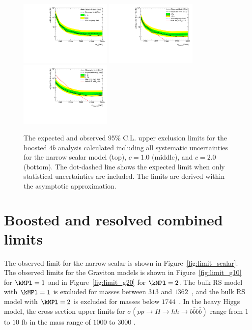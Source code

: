 \begin{figure}
\begin{center}
\includegraphics[width=0.4\textwidth,angle=-90]{figures/boosted/results/limit_boosted_boosted_okt18_s.pdf}
\includegraphics[width=0.4\textwidth,angle=-90]{figures/boosted/results/limit_boosted_boosted_okt18_g10.pdf}
\includegraphics[width=0.4\textwidth,angle=-90]{figures/boosted/results/limit_boosted_boosted_okt18_g20.pdf}
\caption{The expected and observed 95\% C.L. upper exclusion limits for the boosted $4b$ analysis calculated including all systematic uncertainties for the narrow scalar model (top), \Grav $c=1.0$ (middle), and \Grav $c=2.0$ (bottom). The dot-dashed line shows the expected limit when only statistical uncertainties are included. The limits are derived within the asymptotic approximation.}
\label{fig:limit_boosted}
\end{center}
\end{figure}


\section{Boosted and resolved combined limits}
\paragraph{}
The observed limit for the narrow scalar is shown in Figure~\ref{fig:limit_scalar}.
The observed limits for the Graviton models is shown in Figure~\ref{fig:limit_g10} for $\kMPl = 1$ and in Figure~\ref{fig:limit_g20} for $\kMPl = 2$.
The bulk RS model with $\kMPl = 1$ is excluded for masses between $313$ and $1362$~\GeV, and the bulk RS model with $\kMPl = 2$ is excluded for masses below $1744$~\GeV. 
In the heavy Higgs model, the cross section upper limits for $\sigma(pp \to H \to hh \to b\bar{b}b\bar{b})$ range from $1$ to $10$ fb in the mass range of $1000$ to $3000$ \GeV.

